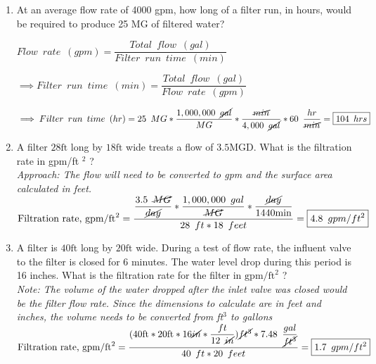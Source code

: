 \documentclass{article}
\begin{document}
\begin{enumerate}
\item At an average flow rate of 4000 gpm, how long of a filter run, in hours, would be required to produce 25 MG of filtered water?\\

\vspace{0.2cm}

$Flow \enspace rate \enspace (gpm)=\dfrac{Total \enspace flow \enspace (gal)}{Filter \enspace run \enspace time \enspace (min)}$

\vspace{0.3cm}

$\implies Filter \enspace run \enspace time \enspace (min)=\dfrac{Total \enspace flow \enspace (gal)}{Flow \enspace rate \enspace (gpm)}$\\

\vspace{0.3cm}

$\implies Filter \enspace run \enspace time \enspace (hr)=25 \enspace MG*\dfrac{1,000,000 \enspace \cancel{gal}}{MG}*\dfrac{\cancel{min}}{4,000 \enspace \cancel{gal}}*60 \enspace \dfrac{hr}{\cancel{min}}=\boxed{104 \enspace hrs}$

\item A filter $28 \mathrm{ft}$ long by $18 \mathrm{ft}$ wide treats a flow of $3.5 \mathrm{MGD}$. What is the filtration rate in gpm/ft ${ }^{2}$ ?\\

\vspace{0.2cm}
\textit{Approach:  The flow will need to be converted to gpm and the surface area calculated in feet.}\\

$\text{Filtration rate, } \mathrm{gpm} / \mathrm{ft}^{2} = 
\dfrac{
\dfrac{3.5 \enspace \cancel{MG}}{ \cancel{day}} * \dfrac{1,000,000 \enspace gal}{\cancel{MG}}
*\dfrac{\cancel{day}}{1440 \mathrm{ min}}}
{28 \enspace ft * 18 \enspace feet}= \boxed{4.8 \enspace gpm/ft^2}$\\
\vspace{0.2cm}
\item A filter is $40 \mathrm{ft}$ long by $20 \mathrm{ft}$ wide. During a test of flow rate, the influent valve to the filter is closed for 6 minutes. The water level drop during this period is 16 inches. What is the filtration rate for the filter in $\mathrm{gpm} / \mathrm{ft}^{2}$ ?\\
\vspace{0.2cm}
\textit{Note:  The volume of the water dropped after the inlet valve was closed would be the filter flow rate.  Since the dimensions to calculate are in feet and inches, the volume needs to be converted from ft$^3$ to gallons}\\
\vspace{0.2cm}
$\text{Filtration rate, } \mathrm{gpm} / \mathrm{ft}^{2} = 
\dfrac{(
40 \mathrm{ ft}*20 \mathrm{ ft} * 16 \mathrm{\cancel{in}}*
\dfrac{ft}{12 \enspace \cancel{in}}
)
\cancel{ft^3}*7.48 \enspace 
\dfrac
{gal}
{\cancel{ft^3}}}
{40 \enspace ft * 20 \enspace feet}= \boxed{1.7\enspace gpm/ft^2}$\\


\end{enumerate}
\end{document}

